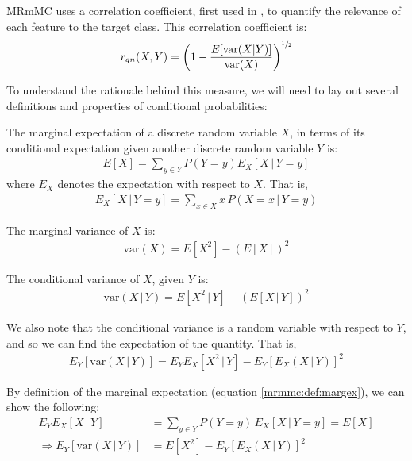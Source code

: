 \documentclass[12pt, twoside, a4paper]{report}
\def\var{\text{var}}
\begin{document}
MRmMC uses a correlation coefficient, first used in \cite{RefWorks:188}, to quantify the relevance of each feature to the target class. This correlation coefficient is:
\begin{align} \label{mrmmc:eq:relevance}
r_{qn}(X, Y) = \left( 1 - \frac{E[\var(X|Y)]}{\var(X)} \right)^{\sfrac{1}{2}}
\end{align}


To understand the rationale behind this measure, we will need to lay out several definitions and properties of conditional probabilities:

\begin{mydef}
\label{mrmmc:def:margex}
The marginal expectation of a discrete random variable $X$, in terms of its conditional expectation given another discrete random variable $Y$ is:
\begin{align*}
E[X] = \sum_{y \in Y} P(Y=y) E_X[X \, | \, Y=y]
\end{align*}
where $E_X$ denotes the expectation with respect to $X$. That is,
\begin{align*}
E_X[X \, | \,Y=y] = \sum_{x\in X} x \, P(X=x \, | \, Y=y)
\end{align*}
\end{mydef}

\begin{mydef}
\label{mrmmc:def:margvar}
The marginal variance of $X$ is:
\begin{align*}
\var(X) = E[X^2] - \left( E[X] \right) ^2
\end{align*}
\end{mydef}

\begin{mydef}
The conditional variance of $X$, given $Y$ is:
\begin{align*}
\var(X \, | \, Y) = E[X^2 \, | \, Y] - \left( E[X \, | \, Y] \right)^2
\end{align*}
\end{mydef}

We also note that the conditional variance is a random variable with respect to $Y$, and so we can find the expectation of the quantity. That is,
\begin{align*}
E_Y [ \var(X \, | \, Y) ] = E_YE_X[X^2 \, | \, Y] - E_Y [ E_X(X\,|\,Y) ] ^2
\end{align*}

By definition of the marginal expectation (equation \ref{mrmmc:def:margex}), we can show the following:
\begin{align}
E_YE_X[X \, | \, Y] &= \sum_{y \in Y} P(Y=y) \, E_X[X \, | \, Y=y] = E[X] \label{mrmmc:eq:exp1} \\
\Rightarrow E_Y [ \var(X \, | \, Y) ] &= E[X^2] - E_Y [ E_X(X\,|\,Y) ] ^2 \label{mrmmc:eq:exp2}
\end{align}
\end{document}
